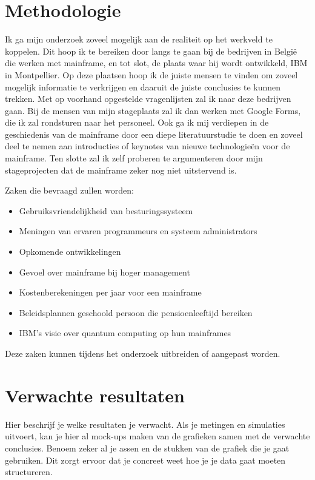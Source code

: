 \section{Methodologie}
\label{sec:methodologie}

Ik ga mijn onderzoek zoveel mogelijk aan de realiteit op het werkveld te koppelen. Dit hoop ik te bereiken door langs te gaan bij de bedrijven in België die werken met mainframe, en tot slot, de plaats waar hij wordt ontwikkeld, IBM in Montpellier. Op deze plaatsen hoop ik de juiste mensen te vinden om zoveel mogelijk informatie te verkrijgen en daaruit de juiste conclusies te kunnen trekken. Met op voorhand opgestelde vragenlijsten zal ik naar deze bedrijven gaan. Bij de mensen van mijn stageplaats zal ik dan werken met Google Forms, die ik zal rondsturen naar het personeel. Ook ga ik mij verdiepen in de geschiedenis van de mainframe door een diepe literatuurstudie te doen en zoveel deel te nemen aan introducties of keynotes van nieuwe technologieën voor de mainframe. Ten slotte zal ik zelf proberen te argumenteren door mijn stageprojecten dat de mainframe zeker nog niet uitstervend is.

Zaken die bevraagd zullen worden:
\begin{itemize} 
\item Gebruiksvriendelijkheid van besturingssysteem
\item Meningen van ervaren programmeurs en systeem administrators
\item Opkomende ontwikkelingen
\item Gevoel over mainframe bij hoger management
\item Kostenberekeningen per jaar voor een mainframe 
\item Beleidsplannen geschoold persoon die pensioenleeftijd bereiken
\item IBM's visie over quantum computing op hun mainframes 
\end{itemize}

Deze zaken kunnen tijdens het onderzoek uitbreiden of aangepast worden. 
\section{Verwachte resultaten}
\label{sec:verwachte_resultaten}

Hier beschrijf je welke resultaten je verwacht. Als je metingen en simulaties uitvoert, kan je hier al mock-ups maken van de grafieken samen met de verwachte conclusies. Benoem zeker al je assen en de stukken van de grafiek die je gaat gebruiken. Dit zorgt ervoor dat je concreet weet hoe je je data gaat moeten structureren.

